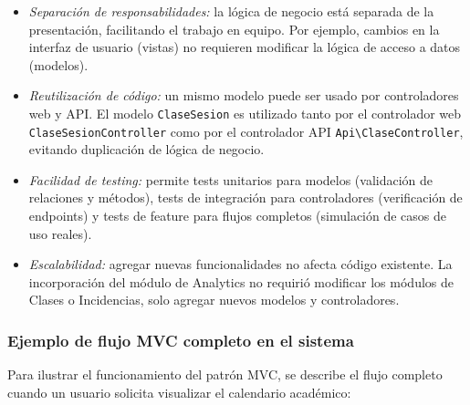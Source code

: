 \begin{itemize}
    \item \textit{Separación de responsabilidades:} la lógica de negocio está separada de la presentación, facilitando el trabajo en equipo. Por ejemplo, cambios en la interfaz de usuario (vistas) no requieren modificar la lógica de acceso a datos (modelos).
    
    \item \textit{Reutilización de código:} un mismo modelo puede ser usado por controladores web y API. El modelo \texttt{ClaseSesion} es utilizado tanto por el controlador web \texttt{ClaseSesionController} como por el controlador API \texttt{Api\textbackslash ClaseController}, evitando duplicación de lógica de negocio.
    
    \item \textit{Facilidad de testing:} permite tests unitarios para modelos (validación de relaciones y métodos), tests de integración para controladores (verificación de endpoints) y tests de feature para flujos completos (simulación de casos de uso reales).
    
    \item \textit{Escalabilidad:} agregar nuevas funcionalidades no afecta código existente. La incorporación del módulo de Analytics no requirió modificar los módulos de Clases o Incidencias, solo agregar nuevos modelos y controladores.
\end{itemize}

\subsubsection{Ejemplo de flujo MVC completo en el sistema}

Para ilustrar el funcionamiento del patrón MVC, se describe el flujo completo cuando un usuario solicita visualizar el calendario académico:

